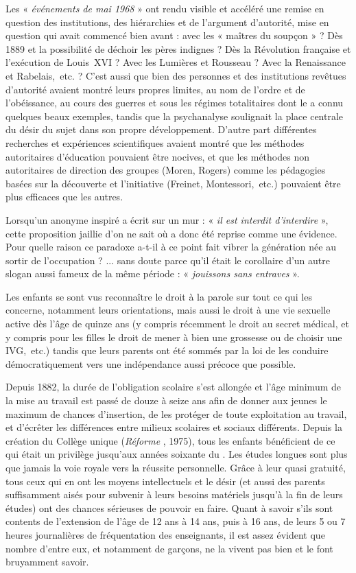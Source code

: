  Les « \emph{événements de mai 1968} » ont rendu visible et accéléré une remise en question des institutions, des hiérarchies et de l'argument d'autorité, mise en question qui avait commencé bien avant : avec les « maîtres du soupçon » ? Dès 1889 et la possibilité de déchoir les pères indignes ? Dès la Révolution française et l'exécution de Louis~XVI ? Avec les Lumières et Rousseau ? Avec la Renaissance et Rabelais,~etc. ? C'est aussi que bien des personnes et des institutions revêtues d'autorité avaient montré leurs propres limites, au nom de l'ordre et de l'obéissance, au cours des guerres et sous les régimes totalitaires dont le  a connu quelques beaux exemples, tandis que la psychanalyse soulignait la place centrale du désir du sujet dans son propre développement. D'autre part différentes recherches et expériences scientifiques avaient montré que les méthodes autoritaires d'éducation pouvaient être nocives, et que les méthodes non autoritaires de direction des groupes (Moren, Rogers) comme les pédagogies basées sur la découverte et l'initiative (Freinet, Montessori,~etc.) pouvaient être plus efficaces que les autres.

 Lorsqu'un anonyme inspiré a écrit sur un mur : « \emph{il est interdit d'interdire} », cette proposition jaillie d'on ne sait où a donc été reprise comme une évidence. Pour quelle raison ce paradoxe a-t-il à ce point fait vibrer la génération née au sortir de l'occupation ? ... sans doute parce qu'il était le corollaire d'un autre slogan aussi fameux de la même période : « \emph{jouissons sans entraves} ». 

 Les enfants se sont vus reconnaître le droit à la parole sur tout ce qui les concerne, notamment leurs orientations, mais aussi le droit à une vie sexuelle active dès l'âge de quinze ans (y compris récemment le droit au secret médical, et y compris pour les filles le droit de mener à bien une grossesse ou de choisir une IVG,~etc.) tandis que leurs parents ont été sommés par la loi de les conduire démocratiquement vers une indépendance aussi précoce que possible. 

 Depuis 1882, la durée de l'obligation scolaire s'est allongée et l'âge minimum de la mise au travail est passé de douze à seize ans afin de donner aux jeunes le maximum de chances d'insertion, de les protéger de toute exploitation au travail, et d'écrêter les différences entre milieux scolaires et sociaux différents. Depuis la création du Collège unique (\emph{Réforme }, 1975), tous les enfants bénéficient de ce qui était un privilège jusqu'aux années soixante du . Les études longues sont plus que jamais la voie royale vers la réussite personnelle. Grâce à leur quasi gratuité, tous ceux qui en ont les moyens intellectuels et le désir (et aussi des parents suffisamment aisés pour subvenir à leurs besoins matériels jusqu'à la fin de leurs études) ont des chances sérieuses de pouvoir en faire. Quant à savoir s'ils sont contents de l'extension de l'âge de 12 ans à 14 ans, puis à 16 ans, de leurs 5 ou 7 heures journalières de fréquentation des enseignants, il est assez évident que nombre d'entre eux, et notamment de garçons, ne la vivent pas bien et le font bruyamment savoir.


